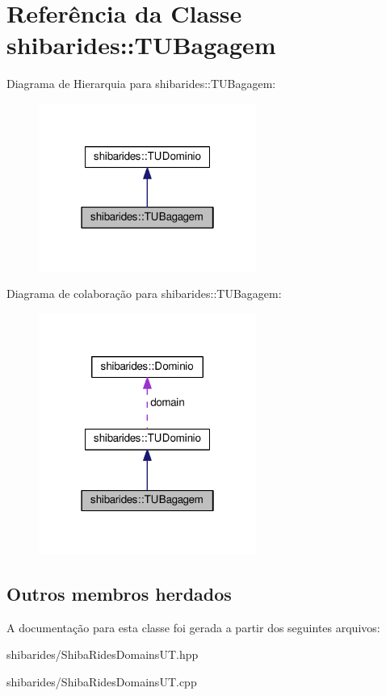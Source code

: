 \hypertarget{classshibarides_1_1TUBagagem}{}\section{Referência da Classe shibarides\+:\+:T\+U\+Bagagem}
\label{classshibarides_1_1TUBagagem}


Diagrama de Hierarquia para shibarides\+:\+:T\+U\+Bagagem\+:\nopagebreak
\begin{figure}[H]
\begin{center}
\leavevmode
\includegraphics[width=202pt]{classshibarides_1_1TUBagagem__inherit__graph}
\end{center}
\end{figure}


Diagrama de colaboração para shibarides\+:\+:T\+U\+Bagagem\+:\nopagebreak
\begin{figure}[H]
\begin{center}
\leavevmode
\includegraphics[width=202pt]{classshibarides_1_1TUBagagem__coll__graph}
\end{center}
\end{figure}
\subsection*{Outros membros herdados}


A documentação para esta classe foi gerada a partir dos seguintes arquivos\+:\begin{DoxyCompactItemize}
\item 
shibarides/Shiba\+Rides\+Domains\+U\+T.\+hpp\item 
shibarides/Shiba\+Rides\+Domains\+U\+T.\+cpp\end{DoxyCompactItemize}
